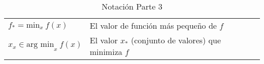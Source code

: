\begin{table}[H]
\begin{center}
\begin{tabularx}{\textwidth}{|l|X|}
            $ f_{*} = \text{min}_x~f(x) $                                                                                                                                                                                                     & El valor de función más pequeño de $f$                                                                \\
            $ {x}_x \in \text{arg min}_{x}~f(x) $                                                                                                                                                                                             & El valor $x_{*}$ (conjunto de valores) que minimiza $f$                                               \\
            \hline
        \end{tabularx}
        \caption{Notación Parte 3}
        \label{tab:nnotation-part-3}
    \end{center}
\end{table}


